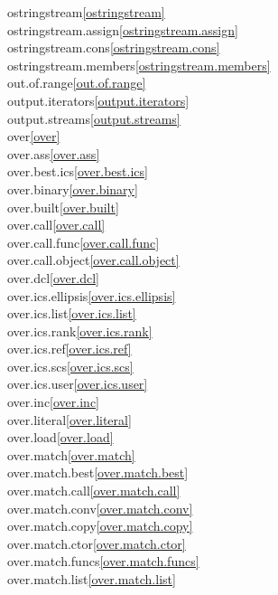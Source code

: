 \begin{multicols}{2}
ostringstream\quad\ref{ostringstream}\\
ostringstream.assign\quad\ref{ostringstream.assign}\\
ostringstream.cons\quad\ref{ostringstream.cons}\\
ostringstream.members\quad\ref{ostringstream.members}\\
out.of.range\quad\ref{out.of.range}\\
output.iterators\quad\ref{output.iterators}\\
output.streams\quad\ref{output.streams}\\
over\quad\ref{over}\\
over.ass\quad\ref{over.ass}\\
over.best.ics\quad\ref{over.best.ics}\\
over.binary\quad\ref{over.binary}\\
over.built\quad\ref{over.built}\\
over.call\quad\ref{over.call}\\
over.call.func\quad\ref{over.call.func}\\
over.call.object\quad\ref{over.call.object}\\
over.dcl\quad\ref{over.dcl}\\
over.ics.ellipsis\quad\ref{over.ics.ellipsis}\\
over.ics.list\quad\ref{over.ics.list}\\
over.ics.rank\quad\ref{over.ics.rank}\\
over.ics.ref\quad\ref{over.ics.ref}\\
over.ics.scs\quad\ref{over.ics.scs}\\
over.ics.user\quad\ref{over.ics.user}\\
over.inc\quad\ref{over.inc}\\
over.literal\quad\ref{over.literal}\\
over.load\quad\ref{over.load}\\
over.match\quad\ref{over.match}\\
over.match.best\quad\ref{over.match.best}\\
over.match.call\quad\ref{over.match.call}\\
over.match.conv\quad\ref{over.match.conv}\\
over.match.copy\quad\ref{over.match.copy}\\
over.match.ctor\quad\ref{over.match.ctor}\\
over.match.funcs\quad\ref{over.match.funcs}\\
over.match.list\quad\ref{over.match.list}\\

\end{multicols}
